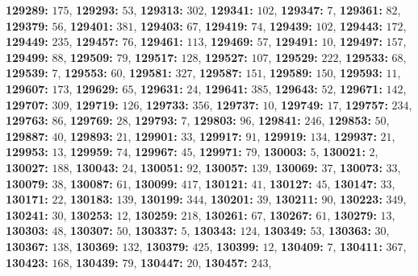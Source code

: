 \textsf{\bfseries 129289:} $175$, \textsf{\bfseries 129293:} $53$, \textsf{\bfseries 129313:} $302$, \textsf{\bfseries 129341:} $102$, \textsf{\bfseries 129347:} $7$, \textsf{\bfseries 129361:} $82$, \textsf{\bfseries 129379:} $56$, \textsf{\bfseries 129401:} $381$, \textsf{\bfseries 129403:} $67$, \textsf{\bfseries 129419:} $74$, \textsf{\bfseries 129439:} $102$, \textsf{\bfseries 129443:} $172$, \textsf{\bfseries 129449:} $235$, \textsf{\bfseries 129457:} $76$, \textsf{\bfseries 129461:} $113$, \textsf{\bfseries 129469:} $57$, \textsf{\bfseries 129491:} $10$, \textsf{\bfseries 129497:} $157$, \textsf{\bfseries 129499:} $88$, \textsf{\bfseries 129509:} $79$, \textsf{\bfseries 129517:} $128$, \textsf{\bfseries 129527:} $107$, \textsf{\bfseries 129529:} $222$, \textsf{\bfseries 129533:} $68$, \textsf{\bfseries 129539:} $7$, \textsf{\bfseries 129553:} $60$, \textsf{\bfseries 129581:} $327$, \textsf{\bfseries 129587:} $151$, \textsf{\bfseries 129589:} $150$, \textsf{\bfseries 129593:} $11$, \textsf{\bfseries 129607:} $173$, \textsf{\bfseries 129629:} $65$, \textsf{\bfseries 129631:} $24$, \textsf{\bfseries 129641:} $385$, \textsf{\bfseries 129643:} $52$, \textsf{\bfseries 129671:} $142$, \textsf{\bfseries 129707:} $309$, \textsf{\bfseries 129719:} $126$, \textsf{\bfseries 129733:} $356$, \textsf{\bfseries 129737:} $10$, \textsf{\bfseries 129749:} $17$, \textsf{\bfseries 129757:} $234$, \textsf{\bfseries 129763:} $86$, \textsf{\bfseries 129769:} $28$, \textsf{\bfseries 129793:} $7$, \textsf{\bfseries 129803:} $96$, \textsf{\bfseries 129841:} $246$, \textsf{\bfseries 129853:} $50$, \textsf{\bfseries 129887:} $40$, \textsf{\bfseries 129893:} $21$, \textsf{\bfseries 129901:} $33$, \textsf{\bfseries 129917:} $91$, \textsf{\bfseries 129919:} $134$, \textsf{\bfseries 129937:} $21$, \textsf{\bfseries 129953:} $13$, \textsf{\bfseries 129959:} $74$, \textsf{\bfseries 129967:} $45$, \textsf{\bfseries 129971:} $79$, \textsf{\bfseries 130003:} $5$, \textsf{\bfseries 130021:} $2$, \textsf{\bfseries 130027:} $188$, \textsf{\bfseries 130043:} $24$, \textsf{\bfseries 130051:} $92$, \textsf{\bfseries 130057:} $139$, \textsf{\bfseries 130069:} $37$, \textsf{\bfseries 130073:} $33$, \textsf{\bfseries 130079:} $38$, \textsf{\bfseries 130087:} $61$, \textsf{\bfseries 130099:} $417$, \textsf{\bfseries 130121:} $41$, \textsf{\bfseries 130127:} $45$, \textsf{\bfseries 130147:} $33$, \textsf{\bfseries 130171:} $22$, \textsf{\bfseries 130183:} $139$, \textsf{\bfseries 130199:} $344$, \textsf{\bfseries 130201:} $39$, \textsf{\bfseries 130211:} $90$, \textsf{\bfseries 130223:} $349$, \textsf{\bfseries 130241:} $30$, \textsf{\bfseries 130253:} $12$, \textsf{\bfseries 130259:} $218$, \textsf{\bfseries 130261:} $67$, \textsf{\bfseries 130267:} $61$, \textsf{\bfseries 130279:} $13$, \textsf{\bfseries 130303:} $48$, \textsf{\bfseries 130307:} $50$, \textsf{\bfseries 130337:} $5$, \textsf{\bfseries 130343:} $124$, \textsf{\bfseries 130349:} $53$, \textsf{\bfseries 130363:} $30$, \textsf{\bfseries 130367:} $138$, \textsf{\bfseries 130369:} $132$, \textsf{\bfseries 130379:} $425$, \textsf{\bfseries 130399:} $12$, \textsf{\bfseries 130409:} $7$, \textsf{\bfseries 130411:} $367$, \textsf{\bfseries 130423:} $168$, \textsf{\bfseries 130439:} $79$, \textsf{\bfseries 130447:} $20$, \textsf{\bfseries 130457:} $243$, 
